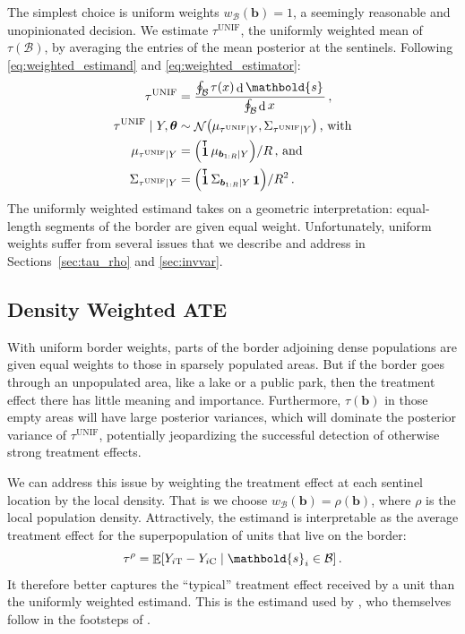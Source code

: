 \documentclass[letter]{article}
\let\originalleft\left
\let\originalright\right
\def\left#1{\mathopen{}\originalleft#1}
\def\right#1{\originalright#1\mathclose{}}
\DeclarePairedDelimiter{\parenthesis}{\lparen}{\rparen}
\DeclarePairedDelimiter{\squarebracket}{\lbrack}{\rbrack}
\newcommand{\del}[1]{\parenthesis*{#1}}
\newcommand{\sbr}[1]{\squarebracket*{#1}}
\DeclareMathOperator{\dif}{d}
\DeclareMathOperator{\E}{\mathbb{E}}
\DeclareMathOperator{\normal}{\mathcal{N}}
\DeclareMathOperator{\ones}{\mathbf{1}}
\newcommand*{\trans}{^{\mkern-1.5mu\intercal}}
\newcommand{\treat}{\mathrm{T}}
\newcommand{\ctrol}{\mathrm{C}}
\newcommand{\svec}{\mathbold{s}}
\newcommand{\border}{\mathcal{B}}
\newcommand{\sentinel}{\bm{b}}
\newcommand{\numsent}{R}
\newcommand{\sentinels}{\sentinel_{1:\numsent}}
\newcommand{\unifavg}{\tau^{\mathrm{UNIF}}}
\newcommand{\taurho}{\tau^{\rho}}
\newcommand{\eqlabel}[1]{\label{#1}}
\newcommand{\hyperparam}{\bm{\theta}}
\newcommand{\weightb}{w_{\border}}
\renewcommand{\cite}[1]{\citet{#1}}
\begin{document}
The simplest choice is uniform weights \(\weightb(\sentinel)=1\), a seemingly reasonable and unopinionated decision.
We estimate \(\unifavg\), the uniformly weighted mean of \(\tau(\border)\), by averaging the entries of the mean posterior at the sentinels.
Following \eqref{eq:weighted_estimand} and \eqref{eq:weighted_estimator}:
\begin{equation}\begin{split}
    \unifavg &= \frac{\oint_\border \left. \tau(x) \dif \svec \right.}
                          {\oint_\border \left. \dif x \right.}\,, \\
                          \unifavg \mid Y, \hyperparam &\sim \normal\del{\mu_{\unifavg \mid Y}, \Sigma_{\unifavg \mid Y}}\,\text{, with} \\
    \mu_{\unifavg \mid Y} &= \del{\ones\trans \mu_{\sentinels \mid Y}} / \numsent\,\text{, and} \\
    \Sigma_{\unifavg \mid Y} &= \del{\ones\trans \Sigma_{\sentinels \mid Y} \ones} / \numsent^2 \,.
\end{split}
\eqlabel{eq:unifavg}
\end{equation}
The uniformly weighted estimand takes on a geometric interpretation: equal-length segments of the border are given equal weight.
Unfortunately, uniform weights suffer from several issues that we describe and address in Sections~\ref{sec:tau_rho} and \ref{sec:invvar}.
    


    	\hypertarget{density-weighted-ate}{%
\subsection{Density Weighted ATE}\label{density-weighted-ate}}

\label{sec:tau_rho}
    


    	With uniform border weights, parts of the border adjoining dense populations are given equal weights to those in sparsely populated areas.
But if the border goes through an unpopulated area, like a lake or a public park, then the treatment effect there has little meaning and importance.
Furthermore, \(\tau(\sentinel)\) in those empty areas will have large posterior variances, which will dominate the posterior variance of \(\unifavg\), potentially jeopardizing the successful detection of otherwise strong treatment effects.

We can address this issue by weighting the treatment effect at each sentinel location by the local density.
That is we choose \(\weightb(\sentinel) = \rho(\sentinel)\), where \(\rho\) is the local population density.
Attractively, the estimand is interpretable as the average treatment effect for the superpopulation of units that live on the border:
\begin{equation}
    \taurho = \E\sbr{Y_{i\treat} - Y_{i\ctrol} \mid \svec_i \in \border}\,.
\end{equation}
It therefore better captures the ``typical'' treatment effect received by a unit than the uniformly weighted estimand.
This is the estimand used by \cite{keele_titiunik_2015}, who themselves follow in the footsteps of \cite{imbens2011regression}.
\end{document}
